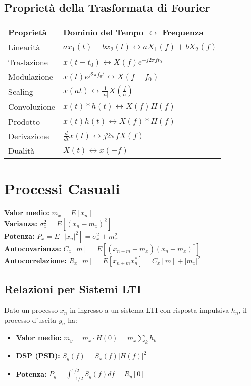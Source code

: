 \begin{multicols}{2}
\subsection*{Proprietà della Trasformata di Fourier}
\begin{tabular}{ll}
\toprule
\textbf{Proprietà} & \textbf{Dominio del Tempo $\leftrightarrow$ Frequenza} \\
\midrule
Linearità & $ax_1(t)+bx_2(t) \leftrightarrow aX_1(f)+bX_2(f)$ \\
Traslazione & $x(t-t_0) \leftrightarrow X(f)e^{-j2\pi f t_0}$ \\
Modulazione & $x(t)e^{j2\pi f_0 t} \leftrightarrow X(f-f_0)$ \\
Scaling & $x(at) \leftrightarrow \frac{1}{|a|}X\left(\frac{f}{a}\right)$ \\
Convoluzione & $x(t) * h(t) \leftrightarrow X(f)H(f)$ \\
Prodotto & $x(t)h(t) \leftrightarrow X(f)*H(f)$ \\
Derivazione & $\frac{d}{dt}x(t) \leftrightarrow j2\pi f X(f)$ \\
Dualità & $X(t) \leftrightarrow x(-f)$ \\
\bottomrule
\end{tabular}

\section{Processi Casuali}
\begin{definition}
\textbf{Valor medio:} $m_x = E[x_n]$ \\
\textbf{Varianza:} $\sigma_x^2 = E[(x_n - m_x)^2]$ \\
\textbf{Potenza:} $P_x = E[|x_n|^2] = \sigma_x^2 + m_x^2$ \\
\textbf{Autocovarianza:} $C_x[m] = E[(x_{n+m}-m_x)(x_n-m_x)^*]$ \\
\textbf{Autocorrelazione:} $R_x[m] = E[x_{n+m}x_n^*] = C_x[m] + |m_x|^2$ \\
\end{definition}

\subsection*{Relazioni per Sistemi LTI}
Dato un processo $x_n$ in ingresso a un sistema LTI con risposta impulsiva $h_n$, il processo d'uscita $y_n$ ha:
\begin{itemize}
    \item \textbf{Valor medio:} $m_y = m_x \cdot H(0) = m_x \sum_k h_k$
    \item \textbf{DSP (PSD):} $S_y(f) = S_x(f) |H(f)|^2$
    \item \textbf{Potenza:} $P_y = \int_{-1/2}^{1/2} S_y(f) df = R_y[0]$
\end{itemize}


\end{multicols}
